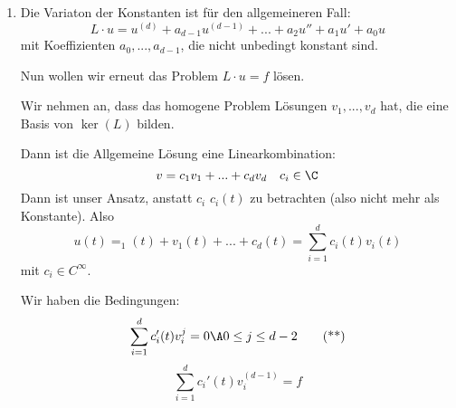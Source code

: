 \documentclass[main.tex]{subfiles}
\begin{document}
\begin{enumerate}
  \item Die Variaton der Konstanten ist für den allgemeineren Fall:
    $$L \cdot u = u^{(d)} + a_{d-1} u^{(d-1)} + ... + a_2 u'' + a_1 u' + a_0 u$$
    mit Koeffizienten $a_0, ..., a_{d-1}$, die nicht unbedingt konstant sind.

    Nun wollen wir erneut das Problem $L \cdot u = f$ lösen.

    Wir nehmen an, dass das homogene Problem Lösungen $v_1,...,v_d$ hat, die eine Basis von $\ker(L)$ bilden.

    Dann ist die Allgemeine Lösung eine Linearkombination:
    $$v = c_1 v_1 + ... + c_d v_d  \quad c_i \in \C$$
    Dann ist unser Ansatz, anstatt $c_i$ $c_i(t)$ zu betrachten (also nicht mehr als Konstante). Also
    \begin{equation*}
      u(t) = _1(t) + v_1 (t) + ... + c_d(t) = \sum \limits_{i=1}^d c_i(t)v_i(t) \tag{*}
    \end{equation*}
    mit $c_i \in C^\infty$.

    Wir haben die Bedingungen:
    \begin{equation*}
      \sum \limits_{i=1}^d c_i'(t) v_i^{j} = 0 \A 0 \leq j \leq d-2 \tag{**}
    \end{equation*}
    \begin{equation*}
      \sum \limits_{i=1}^d c_i'(t) v_i^{(d-1)} = f \tag{***}
    \end{equation*}


\end{enumerate}
\end{document}
